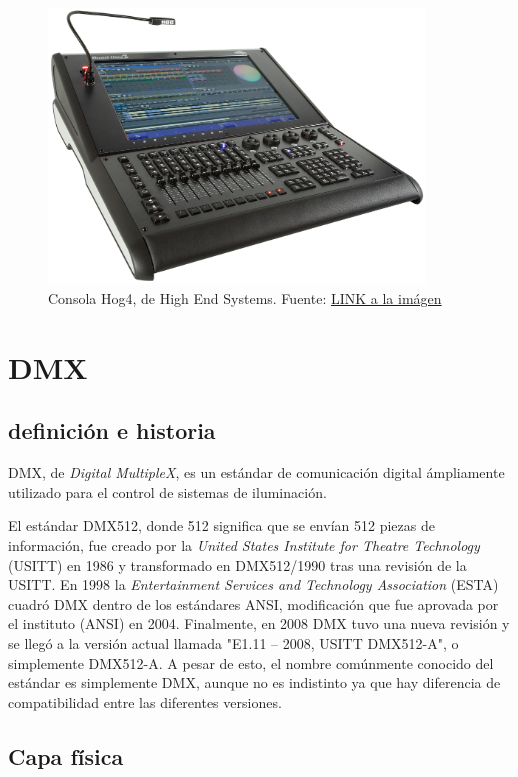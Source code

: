 \begin{figure}[!ht]
	\centering
	\includegraphics[width=10cm,scale=1]{resources/1_5-consolaHOG.png}
	\caption{Consola Hog4, de High End Systems. Fuente: \href{https://www.highend.com/products/consoles}{LINK a la imágen}}
	\label{fig:\thefigure}
\end{figure}

 

\section{DMX}
\subsection{definición e historia}
DMX, de \textit{Digital MultipleX}, es un estándar de comunicación digital ámpliamente utilizado para el control de sistemas de iluminación. 

El estándar DMX512, donde 512 significa que se envían 512 piezas de información, fue creado por la \textit{United States Institute for Theatre Technology} (USITT) en 1986 y transformado en DMX512/1990 tras una revisión de la USITT. En 1998 la \textit{Entertainment Services and Technology Association} (ESTA) cuadró DMX dentro de los estándares ANSI, modificación que fue aprovada por el instituto (ANSI) en 2004. Finalmente, en 2008 DMX tuvo una nueva revisión y se llegó a la versión actual llamada "E1.11 – 2008, USITT DMX512-A", o simplemente DMX512-A. A pesar de esto, el nombre comúnmente conocido del estándar es simplemente DMX, aunque no es indistinto ya que hay diferencia de compatibilidad entre las diferentes versiones.


\subsection{Capa física}

